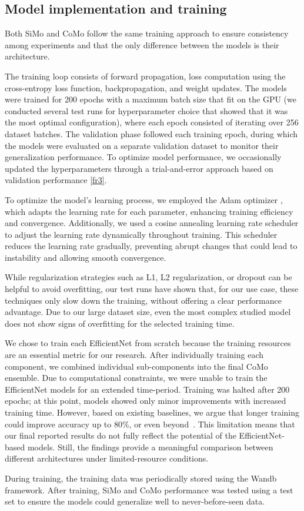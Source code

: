 \subsection{Model implementation and training}\label{sec:implementation:training}

Both SiMo and CoMo follow the same training approach to ensure consistency among experiments and that the only difference between the models is their architecture.

The training loop consists of forward propagation, loss computation using the cross-entropy loss function, backpropagation, and weight updates. The models were trained for 200 epochs with a maximum batch size that fit on the GPU (we conducted several test runs for hyperparameter choice that showed that it was the most optimal configuration), where each epoch consisted of iterating over 256 dataset batches. The validation phase followed each training epoch, during which the models were evaluated on a separate validation dataset to monitor their generalization performance. To optimize model performance, we occasionally updated the hyperparameters through a trial-and-error approach based on validation performance \ref{fr3}.

To optimize the model’s learning process, we employed the Adam optimizer \cite{kingma2014adam}, which adapts the learning rate for each parameter, enhancing training efficiency and convergence. Additionally, we used a cosine annealing learning rate scheduler to adjust the learning rate dynamically throughout training. This scheduler reduces the learning rate gradually, preventing abrupt changes that could lead to instability and allowing smooth convergence.

While regularization strategies such as L1, L2 regularization, or dropout can be helpful to avoid overfitting, our test runs have shown that, for our use case, these techniques only slow down the training, without offering a clear performance advantage. Due to our large dataset size, even the most complex studied model does not show signs of overfitting for the selected training time.

We chose to train each EfficientNet from scratch because the training resources are an essential metric for our research. After individually training each component, we combined individual sub-components into the final CoMo ensemble. Due to computational constraints, we were unable to train the EfficientNet models for an extended time-period. Training was halted after 200 epochs; at this point, models showed only minor improvements with increased training time. However, based on existing baselines, we argue that longer training could improve accuracy up to 80\%, or even beyond~\cite{paperswithcode_imagenet}. This limitation means that our final reported results do not fully reflect the potential of the EfficientNet-based models. Still, the findings provide a meaningful comparison between different architectures under limited-resource conditions.

During training, the training data was periodically stored using the Wandb~\cite{wandb} framework. After training, SiMo and CoMo performance was tested using a test set to ensure the models could generalize well to never-before-seen data.